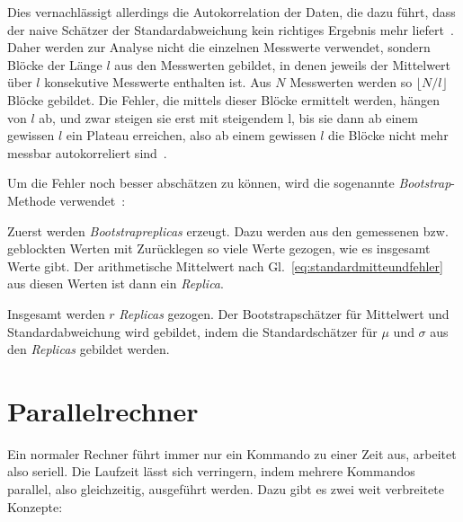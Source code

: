 	Dies vernachlässigt allerdings die Autokorrelation der Daten, die dazu führt, dass der naive Schätzer der Standardabweichung kein richtiges Ergebnis mehr liefert~\cite[vgl. ][S. 72 ff.]{skriptcompphys}. Daher werden zur Analyse nicht die einzelnen Messwerte verwendet, sondern Blöcke der Länge $l$ aus den Messwerten gebildet, in denen jeweils der Mittelwert über $l$ konsekutive Messwerte enthalten ist. Aus $N$ Messwerten werden so $\lfloor N/l \rfloor$ Blöcke gebildet. Die Fehler, die mittels dieser Blöcke ermittelt werden, hängen von $l$ ab, und zwar steigen sie erst mit steigendem l, bis sie dann ab einem gewissen $l$ ein Plateau erreichen, also ab einem gewissen $l$ die Blöcke nicht mehr messbar autokorreliert sind~\cite[vgl. ][S. 75 ff.]{skriptcompphys}.
	
	
	
	
	Um die Fehler noch besser abschätzen zu können, wird die sogenannte \textit{Bootstrap}-Methode verwendet~\cite[vgl. ][S. 64 ff.]{skriptcompphys}:
	
	Zuerst werden \textit{Bootstrapreplicas} erzeugt. Dazu werden aus den gemessenen bzw. geblockten Werten mit Zurücklegen so viele Werte gezogen, wie es insgesamt Werte gibt. Der arithmetische Mittelwert nach Gl.~\ref{eq:standardmitteundfehler} aus diesen Werten ist dann ein \textit{Replica}.
	
	Insgesamt werden $r$ \textit{Replicas} gezogen. Der Bootstrapschätzer für Mittelwert und Standardabweichung wird gebildet, indem die Standardschätzer für $\mu$ und $\sigma$ aus den \textit{Replicas} gebildet werden.
	
	


	\section{Parallelrechner}
	\label{sec:partheorie}
	Ein normaler Rechner führt immer nur ein Kommando zu einer Zeit aus, arbeitet also seriell. Die Laufzeit lässt sich verringern, indem mehrere Kommandos parallel, also gleichzeitig, ausgeführt werden. Dazu gibt es zwei weit verbreitete Konzepte:
